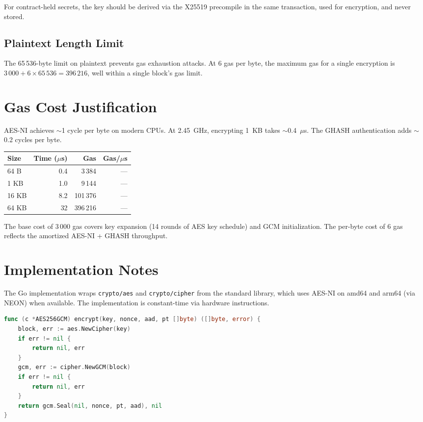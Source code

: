 \documentclass[11pt,a4paper]{article}
\begin{document}
For contract-held secrets, the key should be derived via the X25519 precompile
in the same transaction, used for encryption, and never stored.

\subsection{Plaintext Length Limit}

The 65\,536-byte limit on plaintext prevents gas exhaustion attacks. At 6 gas per
byte, the maximum gas for a single encryption is $3\,000 + 6 \times 65\,536 = 396\,216$,
well within a single block's gas limit.

\section{Gas Cost Justification}

AES-NI achieves $\sim$1 cycle per byte on modern CPUs. At 2.45~GHz, encrypting
1~KB takes $\sim$0.4~$\mu$s. The GHASH authentication adds $\sim$0.2 cycles per byte.

\begin{table}[H]
\centering
\begin{tabular}{lrrr}
\toprule
\textbf{Size} & \textbf{Time ($\mu$s)} & \textbf{Gas} & \textbf{Gas/$\mu$s} \\
\midrule
64 B & 0.4 & 3\,384 & --- \\
1 KB & 1.0 & 9\,144 & --- \\
16 KB & 8.2 & 101\,376 & --- \\
64 KB & 32 & 396\,216 & --- \\
\bottomrule
\end{tabular}
\end{table}

The base cost of 3\,000 gas covers key expansion (14 rounds of AES key schedule)
and GCM initialization. The per-byte cost of 6 gas reflects the amortized AES-NI +
GHASH throughput.

\section{Implementation Notes}

The Go implementation wraps \texttt{crypto/aes} and \texttt{crypto/cipher} from
the standard library, which uses AES-NI on amd64 and arm64 (via NEON) when
available. The implementation is constant-time via hardware instructions.

\begin{lstlisting}[language=Go]
func (c *AES256GCM) encrypt(key, nonce, aad, pt []byte) ([]byte, error) {
    block, err := aes.NewCipher(key)
    if err != nil {
        return nil, err
    }
    gcm, err := cipher.NewGCM(block)
    if err != nil {
        return nil, err
    }
    return gcm.Seal(nil, nonce, pt, aad), nil
}
\end{lstlisting}
\end{document}
